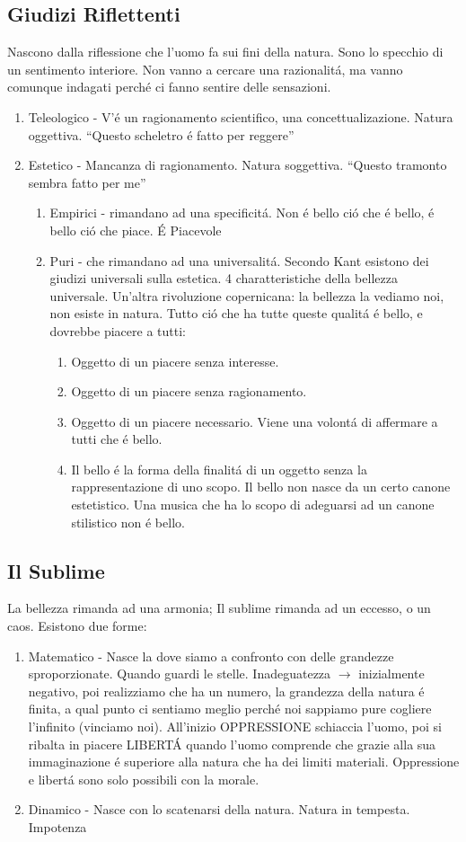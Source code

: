 \documentclass{article}
\begin{document}
\subsection{Giudizi Riflettenti}
Nascono dalla riflessione che l'uomo fa sui fini della natura. Sono lo specchio di un sentimento interiore. Non vanno a cercare una razionalitá, ma vanno comunque indagati perché ci fanno sentire delle sensazioni.
    \begin{enumerate}
        \item Teleologico - V'é un ragionamento scientifico, una concettualizazione. Natura oggettiva. ``Questo scheletro é fatto per reggere''
\item Estetico - Mancanza di ragionamento. Natura soggettiva. ``Questo tramonto sembra fatto per me''
\begin{enumerate}
    \item Empirici - rimandano ad una specificitá. Non é bello ció che é bello, é bello ció che piace. É Piacevole
\item Puri - che rimandano ad una universalitá. Secondo Kant esistono dei giudizi universali sulla estetica. 4 charatteristiche della bellezza universale. Un'altra rivoluzione copernicana: la bellezza la vediamo noi, non esiste in natura. Tutto ció che ha tutte queste qualitá é bello, e dovrebbe piacere a tutti:
\begin{enumerate}
\item Oggetto di un piacere senza interesse.
\item Oggetto di un piacere senza ragionamento.
\item Oggetto di un piacere necessario. Viene una volontá di affermare a tutti che é bello.
\item Il bello é la forma della finalitá di un oggetto senza la rappresentazione di uno scopo. Il bello non nasce da un certo canone estetistico. Una musica che ha lo scopo di adeguarsi ad un canone stilistico non é bello.
\end{enumerate}
\end{enumerate}
\end{enumerate}
\subsection{Il Sublime}
La bellezza rimanda ad una armonia; Il sublime rimanda ad un eccesso, o un caos. Esistono due forme:
\begin{enumerate}
\item Matematico - Nasce la dove siamo a confronto con delle grandezze sproporzionate. Quando guardi le stelle. Inadeguatezza $\to$ inizialmente negativo, poi realizziamo che ha un numero, la grandezza della natura é finita, a qual punto ci sentiamo meglio perché noi sappiamo pure cogliere l'infinito (vinciamo noi). All'inizio OPPRESSIONE schiaccia l'uomo, poi si ribalta in piacere LIBERTÁ quando l'uomo comprende che grazie alla sua immaginazione é superiore alla natura che ha dei limiti materiali. Oppressione e libertá sono solo possibili con la morale.
\item Dinamico - Nasce con lo scatenarsi della natura. Natura in tempesta. Impotenza
\end{enumerate}
\end{document}
